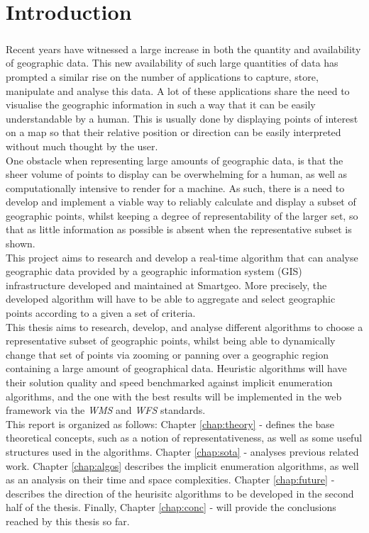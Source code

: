 \chapter{Introduction}
\label{chap:intro}
\paragraph{}
Recent years have witnessed a large increase in both the quantity and availability of geographic data. This new availability of such large quantities of data has prompted a similar rise on the number of applications to capture, store, manipulate and analyse this data.
A lot of these applications share the need to visualise the geographic information in such a way that it can be easily understandable by a human.
This is usually done by displaying points of interest on a map so that their relative position or direction can be easily interpreted without much thought by the user.
\\
One obstacle when representing large amounts of geographic data, is that the sheer volume of points to display can be overwhelming for a human, as well as computationally intensive to render for a machine. As such, there is a need to develop and implement a viable way to reliably calculate and display a subset of geographic points, whilst keeping a degree of representability of the larger set, so that as little information as possible is absent when the representative subset is shown.
\\
This project aims to research and develop a real-time algorithm that can analyse geographic data provided by a geographic information system (GIS) infrastructure developed and maintained at Smartgeo. More precisely, the developed algorithm will have to be able to aggregate and select geographic points according to a given a set of criteria.
\\
This thesis aims to research, develop, and analyse different algorithms to choose a representative subset of geographic points, whilst being able to dynamically change that set of points via zooming or panning over a geographic region containing a large amount of geographical data. Heuristic algorithms will have their solution quality and speed benchmarked against implicit enumeration algorithms, and the one with the best results will be implemented in the web framework via the \emph{WMS} and \emph{WFS} standards.
\\
This report is organized as follows:
Chapter \ref{chap:theory} -  defines the base theoretical concepts, such as a notion of representativeness, as well as some useful structures used in the algorithms. Chapter \ref{chap:sota} -  analyses previous related work. Chapter \ref{chap:algos} describes the implicit enumeration algorithms, as well as an analysis on their time and space complexities. Chapter \ref{chap:future} -  describes the direction of the heurisitc algorithms to be developed in the second half of the thesis. Finally, Chapter \ref{chap:conc} -  will provide the conclusions reached by this thesis so far.